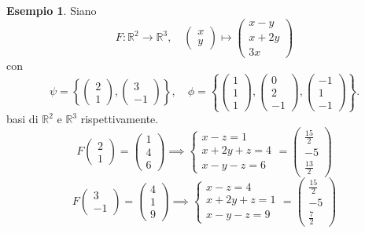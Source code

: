 \documentclass{article}
\theoremstyle{plain}
\theoremstyle{definition}
\newtheorem{exmp}{Esempio}[section]
\theoremstyle{remark}
\begin{document}
\vspace{10pt}

\begin{exmp}
    Siano 
    \[F:\mathbb{R}^2\to\mathbb{R}^3,\quad\begin{pmatrix}x\\y\end{pmatrix}\mapsto\begin{pmatrix}x-y\\x+2y\\3x\end{pmatrix}\]
    con 
    \[\psi=\left\{\begin{pmatrix}2\\1\end{pmatrix},\begin{pmatrix}3\\-1\end{pmatrix}\right\},\quad \phi=\left\{\begin{pmatrix}1\\1\\1\end{pmatrix},\begin{pmatrix}0\\2\\-1\end{pmatrix},\begin{pmatrix}-1\\1\\-1\end{pmatrix}\right\}.\]
    basi di $\mathbb{R}^2$ e $\mathbb{R}^3$ rispettivamente.
    \[F\begin{pmatrix}2\\1\end{pmatrix}=\begin{pmatrix}1\\4\\6\end{pmatrix}\implies\begin{cases}x-z=1\\x+2y+z=4\\x-y-z=6\end{cases}=\begin{pmatrix}\frac{15}{2}\\-5\\\frac{13}{2}\end{pmatrix}\]
    \[F\begin{pmatrix}3\\-1\end{pmatrix}=\begin{pmatrix}4\\1\\9\end{pmatrix}\implies\begin{cases}x-z=4\\x+2y+z=1\\x-y-z=9\end{cases}=\begin{pmatrix}\frac{15}{2}\\-5\\\frac{7}{2}\end{pmatrix}\]

\end{exmp}
\end{document}
